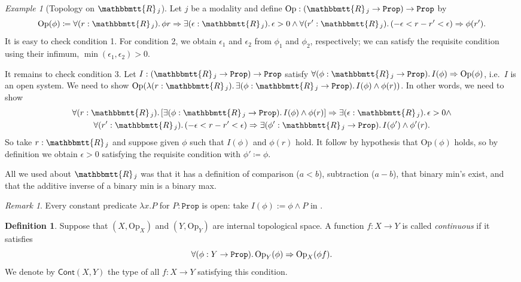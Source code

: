 \documentclass[11pt, oneside, article]{memoir}
\theoremstyle{plain}
\theoremstyle{definition}
\newtheorem{definition}[theorem]{Definition}
\theoremstyle{remark}
\newtheorem{example}[theorem]{Example}
\newtheorem{remark}[theorem]{Remark}
\newcommand{\const}[1]{\mathtt{#1}}
\newcommand{\Set}[1]{\mathrm{#1}}
\newcommand{\Fun}[1]{\mathsf{#1}}
\newcommand{\internal}[1]{\raisebox{-.03ex}{$\mathbbmtt{#1}$}}
\newcommand{\hs}{\hspace{1.1pt}}
\newcommand{\tRR}{\internal{R}\hs}
\newcommand{\Cont}{\Fun{Cont}}
\newcommand{\Prop}{\const{Prop}}
\newcommand{\Op}{\Set{Op}}
\newcommand{\imp}{\Rightarrow}
\begin{document}
\begin{example}[Topology on $\tRR_j$]\label{ex.usual_topology_R}
Let $j$ be a modality and define $\Op:(\tRR_j\to\Prop)\to\Prop$ by
\[\Op(\phi)\coloneqq\forall(r:\tRR_j)\ldotp\phi r\imp\exists(\epsilon:\tRR_j)\ldotp\epsilon>0\wedge\forall(r':\tRR_j)\ldotp(-\epsilon<r-r'<\epsilon)\imp\phi(r').\]
It is easy to check condition 1. For condition 2, we obtain $\epsilon_1$ and $\epsilon_2$ from $\phi_1$ and $\phi_2$, respectively; we can satisfy the requisite condition using their infimum, $\min(\epsilon_1,\epsilon_2)>0$.

It remains to check condition 3. Let $I:(\tRR_j\to\Prop)\to\Prop$ satisfy $\forall(\phi:\tRR_j\to\Prop)\ldotp I(\phi)\imp\Op(\phi)$, i.e.\ $I$ is an open system. We need to show $\Op(\lambda(r:\tRR_j)\ldotp\exists(\phi:\tRR_j\to\Prop)\ldotp I(\phi)\wedge\phi (r))$. In other words, we need to show
\begin{multline*}
  \forall(r:\tRR_j)\ldotp[\exists(\phi:\tRR_j\to\Prop)\ldotp I(\phi)\wedge\phi(r)]\imp\exists(\epsilon:\tRR_j)\ldotp\epsilon>0\wedge\\
  \forall(r':\tRR_j)\ldotp(-\epsilon<r-r'<\epsilon)\imp\exists(\phi':\tRR_j\to\Prop)\ldotp I(\phi')\wedge\phi'(r).
\end{multline*}
So take $r:\tRR_j$ and suppose given $\phi$ such that $I(\phi)$ and $\phi(r)$ hold. It follow by hypothesis that $\Op(\phi)$ holds, so by definition we obtain $\epsilon>0$ satisfying the requisite condition with $\phi'\coloneqq\phi$.

All we used about $\tRR_j$ was that it has a definition of comparison ($a<b$), subtraction ($a-b$), that binary min's exist, and that the additive inverse of a binary min is a binary max.
\end{example}

\begin{remark}
\label{constants_open}
Every constant predicate $\lambda x.P$ for $P : \Prop$ is open: take $I(\phi) := \phi \land P$ in . 
\end{remark}

\begin{definition}\label{def.continuous}
Suppose that $(X,\Op_X)$ and $(Y,\Op_Y)$ are internal topological space. A function $f:X\to Y$ is called \emph{continuous} if it satisfies
\[\forall(\phi:Y\to\Prop)\ldotp\Op_Y(\phi)\imp\Op_X(\phi f).\]
We denote by $\Cont(X,Y)$ the type of all $f:X\to Y$ satisfying this condition.
\end{definition}
\end{document}
